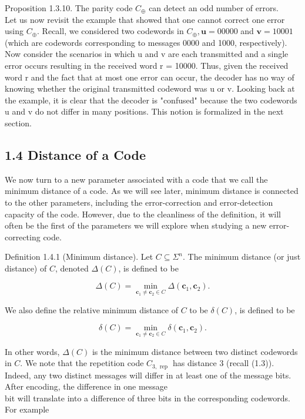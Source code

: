\documentclass[10pt]{article}
\begin{document}
Proposition 1.3.10. The parity code $C_{\oplus}$ can detect an odd number of errors.\\
Let us now revisit the example that showed that one cannot correct one error using $C_{\oplus}$. Recall, we considered two codewords in $C_{\oplus}, \mathbf{u}=00000$ and $\mathbf{v}=10001$ (which are codewords corresponding to messages 0000 and 1000, respectively). Now consider the scenarios in which u and v are each transmitted and a single error occurs resulting in the received word r = 10000. Thus, given the received word r and the fact that at most one error can occur, the decoder has no way of knowing whether the original transmitted codeword was u or v. Looking back at the example, it is clear that the decoder is "confused" because the two codewords u and v do not differ in many positions. This notion is formalized in the next section.

\subsection*{1.4 Distance of a Code}
We now turn to a new parameter associated with a code that we call the minimum distance of a code. As we will see later, minimum distance is connected to the other parameters, including the error-correction and error-detection capacity of the code. However, due to the cleanliness of the definition, it will often be the first of the parameters we will explore when studying a new error-correcting code.

Definition 1.4.1 (Minimum distance). Let $C \subseteq \Sigma^{n}$. The minimum distance (or just distance) of $C$, denoted $\Delta(C)$, is defined to be

$$
\Delta(C)=\min _{\mathbf{c}_{1} \neq \mathbf{c}_{2} \in C} \Delta\left(\mathbf{c}_{1}, \mathbf{c}_{2}\right) .
$$

We also define the relative minimum distance of $C$ to be $\delta(C)$, is defined to be

$$
\delta(C)=\min _{\mathbf{c}_{1} \neq \mathbf{c}_{2} \in C} \delta\left(\mathbf{c}_{1}, \mathbf{c}_{2}\right) .
$$

In other words, $\Delta(C)$ is the minimum distance between two distinct codewords in $C$. We note that the repetition code $C_{3, \text { rep }}$ has distance 3 (recall (1.3)). Indeed, any two distinct messages will differ in at least one of the message bits. After encoding, the difference in one message\\
bit will translate into a difference of three bits in the corresponding codewords. For example
\end{document}

